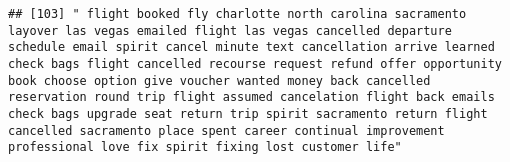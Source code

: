 \documentclass[
]{article}
\begin{document}
\begin{verbatim}
## [103] " flight booked fly charlotte north carolina sacramento layover las vegas emailed flight las vegas cancelled departure schedule email spirit cancel minute text cancellation arrive learned check bags flight cancelled recourse request refund offer opportunity book choose option give voucher wanted money back cancelled reservation round trip flight assumed cancelation flight back emails check bags upgrade seat return trip spirit sacramento return flight cancelled sacramento place spent career continual improvement professional love fix spirit fixing lost customer life"                                                                                                                                                                                                                                                                                                                                                                                                                                                                                                                                                                                                                                                                                                                                                                                                                                                                                                                                                                                                                                                                                                                                                                                                    

\end{verbatim}
\end{document}

